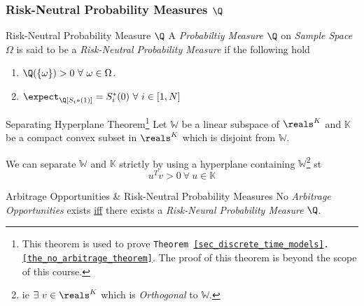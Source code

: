\documentclass[11pt,a4paper]{article}
\begin{document}
\subsubsection{Risk-Neutral Probability Measures $\Q$}

  \begin{definition}{Risk-Neutral Probability Measure $\Q$}
    A \textit{Probabiltiy Measure} $\Q$ on \textit{Sample Space} $\Omega$ is said to be a \textit{Risk-Neutral Probability Measure} if the following hold
    \begin{enumerate}
      \item $\Q(\{\omega\})>0\ \forall\ \omega\in\Omega$.
      \item $\expect_\Q[S_i*(1)]=S_i^*(0)\ \forall\ i\in[1,N]$
    \end{enumerate}
  \end{definition}

  \begin{theorem}{Separating Hyperplane Theorem\footnote{This theorem is used to prove \texttt{Theorem \ref{sec_discrete_time_models}.\ref{the_no_arbitrage_theorem}}. The proof of this theorem is beyond the scope of this course.}}\label{the_separating_hyperplane_theorem}
    Let $\mathbb{W}$ be a linear subspace of $\reals^K$ and $\mathbb{K}$ be a compact convex subset in $\reals^K$ which is disjoint from $\mathbb{W}$.
    \par We can separate $\mathbb{W}$ and $\mathbb{K}$ strictly by using a hyperplane containing $\mathbb{W}$\footnote{ie $\exists\ v\in\reals^K$ which is \textit{Orthogonal} to $\mathbb{W}$.} st
    \[ u^Tv>0\ \forall\ u\in\mathbb{K} \]
  \end{theorem}

  \begin{theorem}{Arbitrage Opportunities \& Risk-Neutral Probability Measures}\label{the_no_arbitrage_theorem}
    No \textit{Arbitrage Opportunities} exists \underline{iff} there exists a \textit{Risk-Neural Probability Measure} $\Q$.
  \end{theorem}
\end{document}
